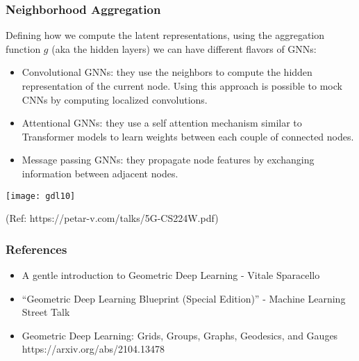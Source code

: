 \begin{frame}[fragile]\frametitle{Neighborhood Aggregation}

Defining how we compute the latent representations, using the aggregation function $g$ (aka the hidden layers) we can have different flavors of GNNs:

\begin{itemize}
\item Convolutional GNNs: they use the neighbors to compute the hidden representation of the current node. Using this approach is possible to mock CNNs by computing localized convolutions.
\item Attentional GNNs: they use a self attention mechanism similar to Transformer models to learn weights between each couple of connected nodes.
\item Message passing GNNs: they propagate node features by exchanging information between adjacent nodes.
\end{itemize}
	
\begin{center}
\texttt{[image: gdl10]}
\end{center}

{\tiny (Ref: https://petar-v.com/talks/5G-CS224W.pdf)}	

\end{frame}






\begin{frame}[fragile]\frametitle{References}

\begin{itemize}
\item A gentle introduction to Geometric Deep Learning - Vitale Sparacello
\item ``Geometric Deep Learning Blueprint (Special Edition)'' - Machine Learning Street Talk
\item Geometric Deep Learning: Grids, Groups, Graphs, Geodesics, and Gauges
https://arxiv.org/abs/2104.13478
\end{itemize}
	  
\end{frame}
